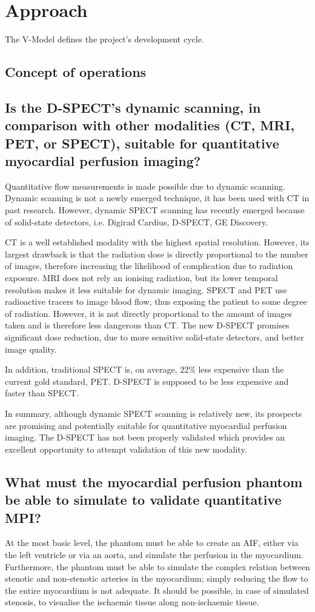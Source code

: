 \section{Approach}
The V-Model defines the project's development cycle. 

\subsection{Concept of operations}
\subsection*{Is the D-SPECT's dynamic scanning, in comparison with other modalities (CT, MRI, PET, or SPECT), suitable for quantitative myocardial perfusion imaging?}
Quantitative flow measurements is made possible due to dynamic scanning. Dynamic scanning is not a newly emerged technique, it has been used with \ac{CT} in past research. However, dynamic \ac{SPECT} scanning has recently emerged because of solid-state detectors, i.e. Digirad Cardius, D-SPECT, GE Discovery.

\ac{CT} is a well established modality with the highest spatial resolution. However, its largest drawback is that the radiation dose is directly proportional to the number of images, therefore increasing the likelihood of complication due to radiation exposure. \ac{MRI} does not rely an ionising radiation, but its lower temporal resolution makes it less suitable for dynamic imaging. \ac{SPECT} and \ac{PET} use radioactive tracers to image blood flow, thus exposing the patient to some degree of radiation. However, it is not directly proportional to the amount of images taken and is therefore less dangerous than \ac{CT}. The new D-SPECT promises significant dose reduction, due to more sensitive solid-state detectors, and better image quality.

In addition, traditional \ac{SPECT} is, on average, 22\% less expensive than the current gold standard, \ac{PET}. D-SPECT is supposed to be less expensive and faster than \ac{SPECT}.

In summary, although dynamic \ac{SPECT} scanning is relatively new, its prospects are promising and potentially suitable for quantitative myocardial perfusion imaging. The D-SPECT has not been properly validated which provides an excellent opportunity to attempt validation of this new modality.

\subsection{What must the myocardial perfusion phantom be able to simulate to validate quantitative MPI?}
At the most basic level, the phantom must be able to create an \ac{AIF}, either via the left ventricle or via an aorta, and simulate the perfusion in the myocardium. Furthermore, the phantom must be able to simulate the complex relation between stenotic and non-stenotic arteries in the myocardium; simply reducing the flow to the entire myocardium is not adequate. It should be possible, in case of simulated stenosis, to visualise the ischaemic tissue along non-ischaemic tissue.

